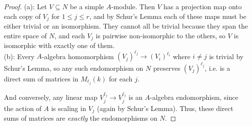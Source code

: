 \documentclass{amsart}
\begin{document}
	\begin{proof}
		(a): Let $V\subseteq N$ be a simple $A$-module. Then $V$ has a projection map onto each copy of $V_j$ for $1\leq j \leq r$, and by Schur's Lemma each of these maps must be either trivial or an isomorphism. They cannot all be trivial because they span the entire space of $N$, and each $V_j$ is pairwise non-isomorphic to the others, so $V$ is isomorphic with exactly one of them.\\
		
		(b): Every $A$-algebra homomorphism $(V_j)^{\ell_j}\to (V_i)^{\ell_i}$ where $i\neq j$ is trivial by Schur's Lemma, so any such endomorphism on $N$ preserves $(V_j)^{\ell_j}$, i.e. is a direct sum of matrices in $M_{\ell_j}(k)$ for each $j$. 
		
		And conversely, any linear map $V_j^{\ell_j}\to V_j^{\ell_j}$ is an $A$-algebra endomorphism, since the action of $A$ is scaling in $V_j$ (again by Schur's Lemma). Thus, these direct sums of matrices are \textit{exactly} the endomorphisms on $N$.
	\end{proof}
\end{document}
